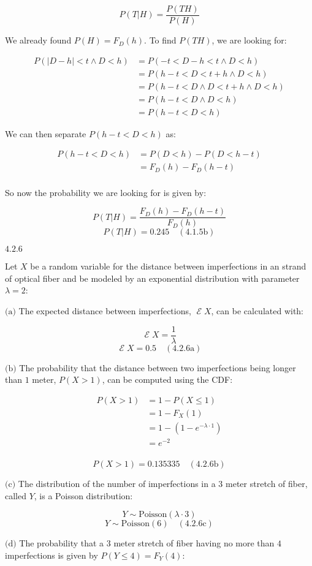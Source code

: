 \documentclass{article}
\newcommand{\problem}[2]{$\boxed{\text{#1.#2}}$}
\newcommand{\subproblem}[3]{$\boxed{\text{(#3)}}$}
\newcommand{\subsolution}[4]{\boxed{#4\quad(\text{#1.#2#3})}}
\newcommand{\multistep}[1]{\begin{array}{rl} #1 \end{array}}
\DeclareMathOperator{\E}{\mathcal{E}}
\begin{document}
\[
P(T|H)=\frac{P(TH)}{P(H)}
\]

We already found $P(H)=F_D(h)$. To find $P(TH)$, we are looking for:

\[
\multistep{
P(|D-h|<t \wedge D<h)&=P(-t<D-h<t \wedge D<h) \\
&=P(h-t<D<t+h \wedge D<h) \\
&=P(h-t<D \wedge D<t+h\wedge D<h) \\
&=P(h-t<D \wedge D<h) \\
&=P(h-t<D<h)
}
\]

We can then separate $P(h-t<D<h)$ as:

\[
\multistep{
P(h-t<D<h)&=P(D<h)-P(D<h-t) \\
&=F_D(h)-F_D(h-t) \\
}
\]

So now the probability we are looking for is given by:

\[
P(T|H)=\frac{F_D(h)-F_D(h-t)}{F_D(h)}
\] \[
\subsolution{4.1}{5}{b}{P(T|H)=0.245}
\]

%
\problem{4.2}{6}

Let $X$ be a random variable for the distance between imperfections in
an strand of optical fiber and be modeled by an exponential
distribution with parameter $\lambda=2$:

%
\subproblem{4.2}{6}{a} The expected distance between imperfections,
$\E{}X$, can be calculated with:

\[
\E X=\frac{1}{\lambda}
\] \[
\subsolution{4.2}{6}{a}{\E X=0.5}
\]

%
\subproblem{4.2}{6}{b} The probability that the distance between two
imperfections being longer than $1$ meter, $P(X>1)$, can be computed
using the CDF:

\[
\multistep{
P(X>1)&=1-P(X\le 1) \\
&=1-F_X(1) \\
&=1-\left(1-e^{-\lambda\cdot1}\right) \\
&=e^{-2} \\
}
\]

\[
\subsolution{4.2}{6}{b}{P(X>1)=0.135335}
\]

%
\subproblem{4.2}{6}{c} The distribution of the number of imperfections
in a $3$ meter stretch of fiber, called $Y$, is a Poisson
distribution:

\[
Y\sim \text{Poisson}(\lambda\cdot3)
\] \[
\subsolution{4.2}{6}{c}{Y\sim\text{Poisson}(6)}
\]

%
\subproblem{4.2}{6}{d} The probability that a $3$ meter stretch of
fiber having no more than $4$ imperfections is given by
$P(Y\le4)=F_Y(4)$:
\end{document}
